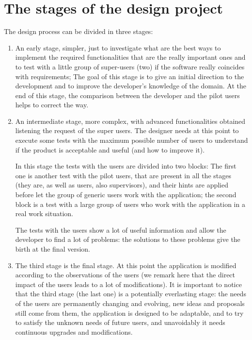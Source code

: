 \section{The stages of the design project}

The design process can be divided in three stages:

\begin{enumerate}

\item An early stage, simpler, just to investigate what are the best ways to implement the required functionalities that are the really important ones and to test with a little group of super-users (two) if the software really coincides with requirements; The goal of this stage is to give an initial direction to the development and to improve the developer's knowledge of the domain. At the end of this stage, the comparison between the developer and the pilot users helps to correct the way.

\item An intermediate stage, more complex, with advanced functionalities obtained listening the request of the super users.  
The designer needs at this point to execute some tests with the maximum possible number of users to understand if the product is acceptable and useful (and how to improve it). 

In this stage the tests with the users are divided into two blocks:  
The first one is another test with the pilot users, that are present in all the stages (they are, as well as users, also supervisors), and their hints are applied before let the group of generic users work with the application;
the second block is a test with a large group of users who work with the application in a real work situation.

The tests with the users show a lot of useful information and allow the developer to find a lot of problems: the solutions to these problems give the birth at the final version. 

\item
The third stage is the final stage. At this point the application is modified according to the observations of the users (we remark here that the direct impact of the users leads to a lot of modifications). It is important to notice that the third stage (the last one) is a potentially everlasting stage: the needs of the users are permanently changing and evolving, new ideas and proposals still come from them, the application is designed to be adaptable, and to try to satisfy the unknown needs of future users, and unavoidably it needs continuous upgrades and modifications. 

\end{enumerate}


